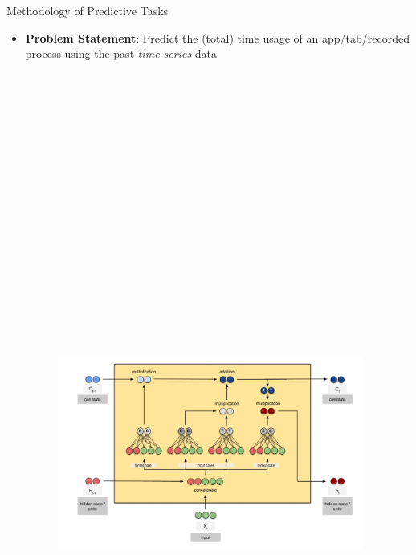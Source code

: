 \documentclass[final]{beamer}
\newlength{\colwidth}
\begin{document}
\begin{frame}[t]
\begin{columns}[t]
\begin{column}{\colwidth}
\begin{exampleblock}{\LARGE{Methodology of Predictive Tasks}}
{    \begin{itemize}
       \item \textbf{Problem Statement}: Predict the (total) time usage of an app/tab/recorded process using the past \textit{time-series} data
       \begin{figure}\includegraphics[width=0.95\textwidth, height=25cm]{lstm_1.png}\end{figure}


\end{itemize}}
\end{exampleblock}
\end{column}
\end{columns}
\end{frame}
\end{document}
